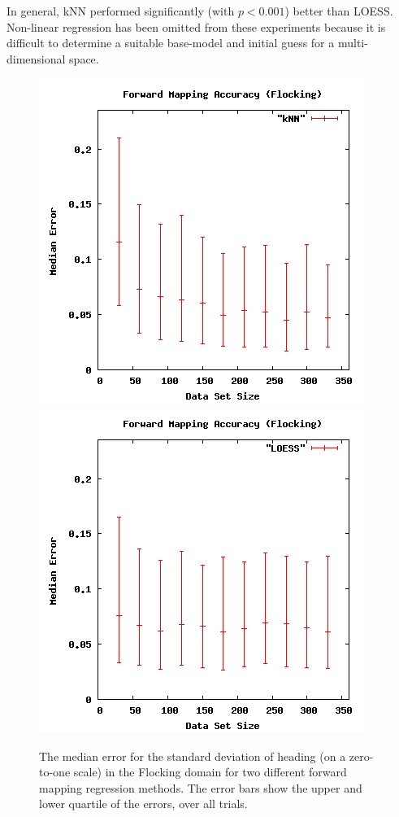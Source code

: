 In general, kNN performed significantly (with $p < 0.001$) better than LOESS.
Non-linear regression has been omitted from these experiments because it is difficult to determine a suitable base-model and initial guess for a multi-dimensional space.

\begin{figure}[ht]
\centering
\includegraphics[scale=.4]{images/results_flocking/fmacc-kNN.png}
\includegraphics[scale=.4]{images/results_flocking/fmacc-LOESS.png}
\caption{The median error for the standard deviation of heading (on a zero-to-one scale) in the Flocking domain for two different forward mapping regression methods.
The error bars show the upper and lower quartile of the errors, over all trials.}
\label{fig:flockfmacc}
\end{figure}

